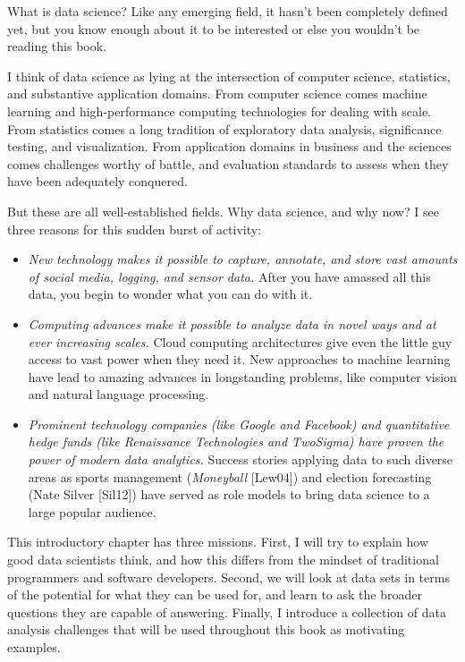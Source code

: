\documentclass[10pt]{article}
\begin{document}
What is data science? Like any emerging field, it hasn't been completely defined yet, but you know enough about it to be interested or else you wouldn't be reading this book.

I think of data science as lying at the intersection of computer science, statistics, and substantive application domains. From computer science comes machine learning and high-performance computing technologies for dealing with scale. From statistics comes a long tradition of exploratory data analysis, significance testing, and visualization. From application domains in business and the sciences comes challenges worthy of battle, and evaluation standards to assess when they have been adequately conquered.

But these are all well-established fields. Why data science, and why now? I see three reasons for this sudden burst of activity:

\begin{itemize}
  \item \textit{New technology makes it possible to capture, annotate, and store vast amounts of social media, logging, and sensor data.} After you have amassed all this data, you begin to wonder what you can do with it.
  \item \textit{Computing advances make it possible to analyze data in novel ways and at ever increasing scales.} Cloud computing architectures give even the little guy access to vast power when they need it. New approaches to machine learning have lead to amazing advances in longstanding problems, like computer vision and natural language processing.
  \item \textit{Prominent technology companies (like Google and Facebook) and quantitative hedge funds (like Renaissance Technologies and TwoSigma) have proven the power of modern data analytics.} Success stories applying data to such diverse areas as sports management (\textit{Moneyball} [Lew04]) and election forecasting (Nate Silver [Sil12]) have served as role models to bring data science to a large popular audience.
\end{itemize}

This introductory chapter has three missions. First, I will try to explain how good data scientists think, and how this differs from the mindset of traditional programmers and software developers. Second, we will look at data sets in terms of the potential for what they can be used for, and learn to ask the broader questions they are capable of answering. Finally, I introduce a collection of data analysis challenges that will be used throughout this book as motivating examples.
\end{document}
